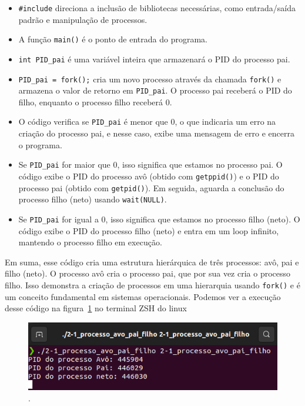 \documentclass[
	12pt,				%
	openright,			%
	oneside,			%
	a4paper,			%
	chapter=TITLE,		%
	english,			%
	french,				%
	spanish,			%
	brazil				%
	]{abntex2}
\theoremstyle{definition}
\begin{document}
\begin{itemize}
    \item \texttt{\#include} direciona a inclusão de bibliotecas necessárias, como entrada/saída padrão e manipulação de processos.
    \item A função \texttt{main()} é o ponto de entrada do programa.
    \item \texttt{int PID\_pai} é uma variável inteira que armazenará o PID do processo pai.
    \item \texttt{PID\_pai = fork();} cria um novo processo através da chamada \texttt{fork()} e armazena o valor de retorno em \texttt{PID\_pai}. O processo pai receberá o PID do filho, enquanto o processo filho receberá 0.
    \item O código verifica se \texttt{PID\_pai} é menor que 0, o que indicaria um erro na criação do processo pai, e nesse caso, exibe uma mensagem de erro e encerra o programa.
    \item Se \texttt{PID\_pai} for maior que 0, isso significa que estamos no processo pai. O código exibe o PID do processo avô (obtido com \texttt{getppid()}) e o PID do processo pai (obtido com \texttt{getpid()}). Em seguida, aguarda a conclusão do processo filho (neto) usando \texttt{wait(NULL)}.
    \item Se \texttt{PID\_pai} for igual a 0, isso significa que estamos no processo filho (neto). O código exibe o PID do processo filho (neto) e entra em um loop infinito, mantendo o processo filho em execução.
\end{itemize}

Em suma, esse código cria uma estrutura hierárquica de três processos: avô, pai e filho (neto). O processo avô cria o processo pai, 
que por sua vez cria o processo filho. Isso demonstra a criação de processos em uma hierarquia usando \texttt{fork()} e é 
um conceito fundamental em sistemas operacionais. Podemos ver a execução desse código na figura~\ref{fig:run_processo1} no terminal ZSH do linux

\begin{figure}
    \centering
    \includegraphics[width=1.0\textwidth]{imagens/run_processo1.png}
	\caption{.}
	\label{fig:run_processo1}
\end{figure}
\end{document}
